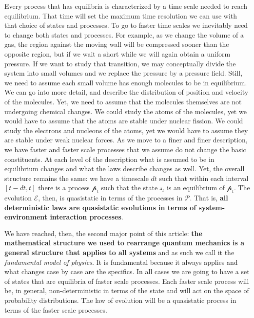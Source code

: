 \documentclass[applsci,article,submit,moreauthors,pdftex]{Definitions/mdpi}
\begin{document}
Every process that has equilibria is characterized by a time scale needed to reach equilibrium. That time will set the maximum time resolution we can use with that choice of states and processes. To go to faster time scales we inevitably need to change both states and processes. For example, as we change the volume of a gas, the region against the moving wall will be compressed sooner than the opposite region, but if we wait a short while we will again obtain a uniform pressure. If we want to study that transition, we may conceptually divide the system into small volumes and we replace the pressure by a pressure field. Still, we need to assume each small volume has enough molecules to be in equilibrium. We can go into more detail, and describe the distribution of position and velocity of the molecules. Yet, we need to assume that the molecules themselves are not undergoing chemical changes. We could study the atoms of the molecules, yet we would have to assume that the atoms are stable under nuclear fission. We could study the electrons and nucleons of the atoms, yet we would have to assume they are stable under weak nuclear forces. As we move to a finer and finer description, we have faster and faster scale processes that we assume do not change the basic constituents. At each level of the description what is assumed to be in equilibrium changes and what the laws describe changes as well. Yet, the overall structure remains the same: we have a timescale $dt$ such that within each interval $[t-dt, t]$ there is a process $\mathcal{p}_t$ such that the state $\mathcal{s}_t$ is an equilibrium of $\mathcal{p}_t$. The evolution $\mathcal{E}$, then, is quasistatic in terms of the processes in $\mathcal{P}$. That is, \textbf{all deterministic laws are quasistatic evolutions in terms of system-environment interaction processes}.

We have reached, then, the second major point of this article: \textbf{the mathematical structure we used to rearrange quantum mechanics is a general structure that applies to all systems} and as such we call it the \emph{fundamental model of physics}. It is fundamental because it always applies and what changes case by case are the specifics. In all cases we are going to have a set of states that are equilibria of faster scale processes. Each faster scale process will be, in general, non-deterministic in terms of the state and will act on the space of probability distributions. The law of evolution will be a quasistatic process in terms of the faster scale processes.
\end{document}

